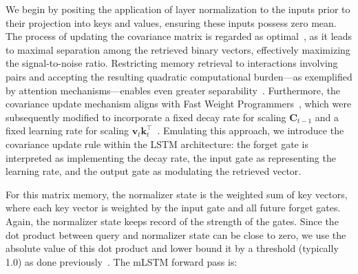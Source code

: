 We begin by positing the application of layer normalization to the inputs prior to their projection into keys and values, ensuring these inputs possess zero mean. The process of updating the covariance matrix is regarded as optimal~\citep{Dayan:91}, as it leads to maximal separation among the retrieved binary vectors, effectively maximizing the signal-to-noise ratio. Restricting memory retrieval to interactions involving pairs and accepting the resulting quadratic computational burden—as exemplified by attention mechanisms—enables even greater separability~\citep{Krotov:16,Krotov:17,Ramsauer:21}. Furthermore, the covariance update mechanism aligns with Fast Weight Programmers~\citep{Schmidhuber:92ncfastweights,Schlag:21}, which were subsequently modified to incorporate a fixed decay rate for scaling $\mathbf{C}_{t-1}$ and a fixed learning rate for scaling 
$\mathbf{v}_{t} \mathbf{k}_t ^\top$~\citep{Ba:16}. Emulating this approach, we introduce the covariance update rule within the LSTM architecture: the forget gate is interpreted as implementing the decay rate, the input gate as representing the learning rate, and the output gate as modulating the retrieved vector.

For this matrix memory, the normalizer state is the weighted sum of key vectors, where each key vector is weighted by the input gate and all future forget gates. Again, the normalizer state keeps record of the strength of the gates. Since the dot product between query and normalizer state can be close to zero, we use the absolute value of this dot product and lower bound it by a threshold (typically 1.0) as done previously~\citep{Sun:23arxiv}. The mLSTM forward pass is:

